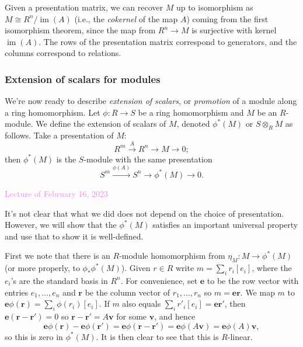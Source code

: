 \documentclass{amsart}[12pt]
\def\image{\operatorname{im}}
\def\im{\image}
\newcommand{\Feb}[1]{\textcolor{violet}{Lecture of February #1, 2023}}
\numberwithin{equation}{section}
\theoremstyle{plain} %
\theoremstyle{definition}
\theoremstyle{remark}
\newcommand{\sssec}[1]{\subsubsection{#1}}
\newcommand{\xra}[1]{\xrightarrow{#1}}
\begin{document}
Given a presentation matrix, we can recover $M$ up to isomorphism as $M\cong R^n/\im(A)$ (i.e., the \emph{cokernel} of the map $A$) coming from the first isomorphism theorem, since the map from $R^n\to M$ is surjective with kernel $\im(A)$. The rows of the presentation matrix correspond to generators, and the columns correspond to relations.






\sssec{Extension of scalars for modules}
We're now ready to describe \emph{extension of scalars}, or \emph{promotion} of a module along a ring homomorphism. Let $\phi:R\to S$ be a ring homomorphism and $M$ be an $R$-module. We define the extension of scalars of $M$, denoted $\phi^*(M)$ or $S\otimes_R M$ as follows. Take a presentation of $M$:
\[ R^m \xra{A} R^n \to M \to 0;\]
then $\phi^*(M)$ is the $S$-module with the same presentation
\[ S^m \xra{\phi(A)} S^n \to \phi^*(M) \to 0.\]

\Feb{16}

It's not clear that what we did does not depend on the choice of presentation. However, we will show that the $\phi^*(M)$ satisfies an important universal property and use that to show it is well-defined.

First we note that there is an $R$-module homomorphism from $\eta_M: M \to \phi^*(M)$ (or more properly, to $\phi_*\phi^*(M)$). Given $r\in R$ write $m= \sum_i r_i [e_i]$, where the $e_i$'s are the standard basis in $R^n$. For convenience, set $\mathbf{e}$ to be the row vector with entries $e_1,\dots,e_n$ and $\mathbf{r}$ be the column vector of $r_1,\dots, r_n$ so $m= \mathbf{e}\mathbf{r}$. We map $m$ to $\mathbf{e} \phi(\mathbf{r}) = \sum_i \phi(r_i) [e_i]$. If $m$ also equals $\sum_i r'_i [e_i] = \mathbf{e}\mathbf{r'}$, then $\mathbf{e}(\mathbf{r}-\mathbf{r'})= 0$ so $\mathbf{r}-\mathbf{r'} = A\mathbf{v}$ for some $\mathbf{v}$, and hence \[ \mathbf{e} \phi(\mathbf{r}) - \mathbf{e} \phi(\mathbf{r'}) = \mathbf{e} \phi(\mathbf{r}-\mathbf{r'}) = \mathbf{e} \phi(A\mathbf{v}) = \mathbf{e} \phi(A) \mathbf{v},\]
so this is zero in $\phi^*(M)$. It is then clear to see that this is $R$-linear. 
\end{document}

